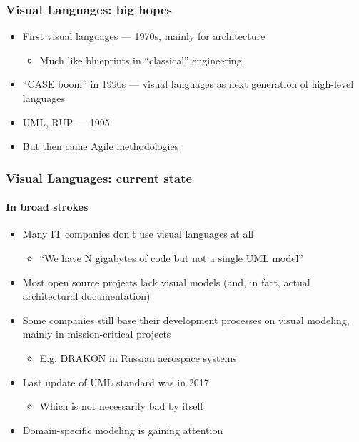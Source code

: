 \documentclass{slides-style}
\begin{document}
    \begin{frame}[plain]
        \titlepage
    \end{frame}

    \begin{frame}
        \frametitle{Visual Languages: big hopes}
        \begin{itemize}
            \item First visual languages --- 1970s, mainly for architecture
            \begin{itemize}
                \item Much like blueprints in ``classical'' engineering
            \end{itemize}
            \item ``CASE boom'' in 1990s --- visual languages as next generation of high-level languages
            \item UML, RUP --- 1995
            \item But then came Agile methodologies
        \end{itemize}
    \end{frame}

    \begin{frame}
        \frametitle{Visual Languages: current state}
        \framesubtitle{In broad strokes}
        \begin{itemize}
            \item Many IT companies don't use visual languages at all
            \begin{itemize}
                \item ``We have N gigabytes of code but not a single UML model''
            \end{itemize}
            \item Most open source projects lack visual models (and, in fact, actual architectural documentation)
            \item Some companies still base their development processes on visual modeling, mainly in mission-critical projects
            \begin{itemize}
                \item E.g. DRAKON in Russian aerospace systems
            \end{itemize}
            \item Last update of UML standard was in 2017
            \begin{itemize}
                \item Which is not necessarily bad by itself
            \end{itemize}
            \item Domain-specific modeling is gaining attention
        \end{itemize}
    \end{frame}
\end{document}
